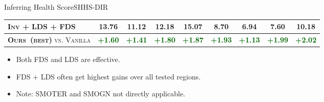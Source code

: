 \begin{frame}{Inferring Health Score}{SHHS-DIR}
\begin{table}[tb]
\begin{center}
{\begin{tabular}{l|cccc|cccc}
					\textsc{Inv} + \textbf{\textsc{LDS}} + \textbf{\textsc{FDS}} & \textbf{13.76} & \textbf{11.12} & \textbf{12.18}  & \textbf{15.07}     & \textbf{8.70}     & 6.94     & \textbf{7.60}      & \textbf{10.18} \\ \midrule\midrule
					\textsc{\textbf{Ours~(best)} vs. Vanilla}   & \textcolor{darkgreen}{\textbf{+1.60}} & \textcolor{darkgreen}{\textbf{+1.41}} & \textcolor{darkgreen}{\textbf{+1.80}} & \textcolor{darkgreen}{\textbf{+1.87}} & \textcolor{darkgreen}{\textbf{+1.93}} & \textcolor{darkgreen}{\textbf{+1.13}} & \textcolor{darkgreen}{\textbf{+1.99}} & \textcolor{darkgreen}{\textbf{+2.02}} \\
					\bottomrule[1.5pt]
				\end{tabular}
			}
		\end{center}
	\end{table}
	\begin{itemize}
		\item Both FDS and LDS are effective.
		\item FDS + LDS often get highest gains over all tested regions.
		\item Note: SMOTER and SMOGN not directly applicable.
	\end{itemize}
\end{frame}

%

